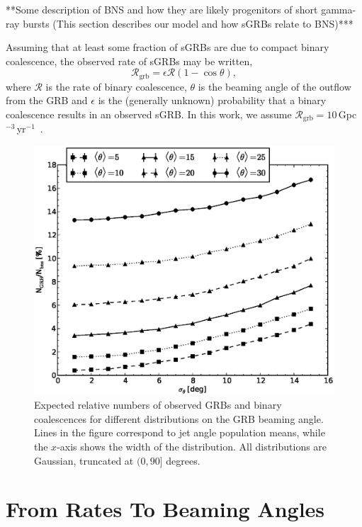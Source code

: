 \documentclass[twocolumn,nofootinbib]{revtex4-1}
\newcommand{\grbrate}{{{\mathcal R}_{\mathrm{grb}}}}
\newcommand{\cbcrate}{{{\mathcal R}}}
\begin{document}
**Some description of BNS and how they are likely progenitors of short
gamma-ray bursts (This section describes our model and how sGRBs relate to BNS)***

Assuming that at least some fraction of sGRBs are due to compact binary
coalescence, the observed rate of sGRBs may be written,
%
\begin{equation}\label{eq:rate2angle}
\grbrate=\epsilon\cbcrate(1-\cos \theta),
\end{equation}
%
where $\cbcrate$ is the rate of binary coalescence, $\theta$ is the beaming
angle of the outflow from the GRB and $\epsilon$ is the (generally unknown)
probability that a binary coalescence results in an observed sGRB.  In this
work, we assume
$\grbrate=10$\,Gpc$^{-3}$\,yr$^{-1}$~\cite{nakar-2007,Dietz11}.
 

\begin{figure}
\centering
\includegraphics[width=\linewidth]{theta_dist_grbfrac.eps}
\caption{\label{fig:thetapopulation} Expected relative
numbers of observed GRBs and binary coalescences for different distributions
on the GRB beaming angle.  Lines in the figure correspond to jet angle
population means, while the $x$-axis shows the width of the distribution.  All 
distributions are Gaussian, truncated at $(0, 90]$ degrees.}
\end{figure}


\section{From Rates To Beaming Angles}
\end{document}
